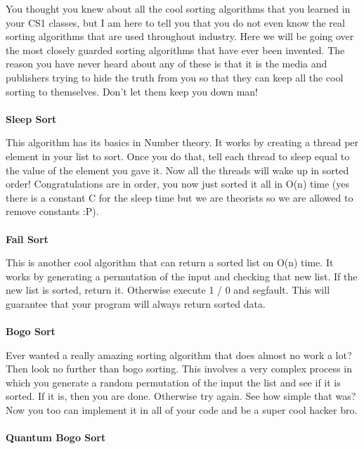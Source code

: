 \documentclass[9pt]{extarticle} %
\begin{document}
%
%
\begin{minipage}[t]{.61\linewidth} %
\vspace{-0.4cm}
\hypertarget{firstnews}{}

You thought you knew about all the cool sorting algorithms that you learned in your CS1 classes, but I am here to tell you that you do not even know the real sorting algorithms that are used throughout industry. Here we will be going over the most closely guarded sorting algorithms that have ever been invented. The reason you have never heard about any of these is that it is the media and publishers trying to hide the truth from you so that they can keep all the cool sorting to themselves. Don't let them keep you down man!
\\
\\
\textbf{Sleep Sort}

This algorithm has its basics in Number theory. It works by creating a thread per element in your list to sort. Once you do that, tell each thread to sleep equal to the value of the element you gave it. Now all the threads will wake up in sorted order! Congratulations are in order, you now just sorted it all in O(n) time (yes there is a constant C for the sleep time but we are theorists so we are allowed to remove constants :P).
\\
\\
\textbf{Fail Sort}

This is another cool algorithm that can return a sorted list on O(n) time. It works by generating a permutation of the input and checking that new list. If the new list is sorted, return it. Otherwise execute 1 / 0 and segfault. This will guarantee that your program will always return sorted data.
\\
\\ 
\textbf{Bogo Sort}

Ever wanted a really amazing sorting algorithm that does almost no work a lot? Then look no further than bogo sorting. This involves a very complex process in which you generate a random permutation of the input the list and see if it is sorted. If it is, then you are done. Otherwise try again. See how simple that was? Now you too can implement it in all of your code and be a super cool hacker bro.
\\
\\
\textbf{Quantum Bogo Sort}


\end{minipage}
\end{document}
